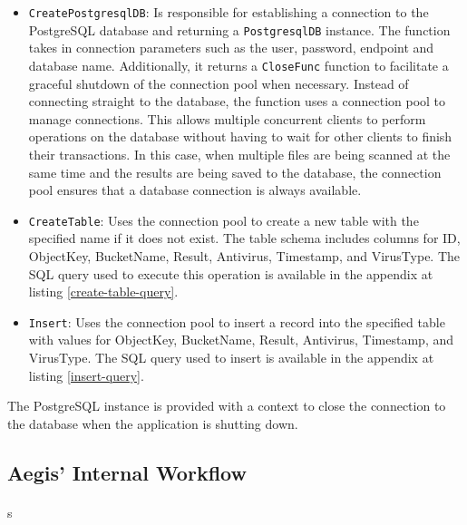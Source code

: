 \documentclass[12pt, conference, final, a4paper, onecolumn, compsoc]{IEEEtran}
\begin{document}
\begin{itemize}
  \item \texttt{CreatePostgresqlDB}: Is responsible for establishing a
        connection to the PostgreSQL database and returning a
        \texttt{PostgresqlDB} instance. The function takes in connection
        parameters such as the user, password, endpoint and database name.
        Additionally, it returns a \texttt{CloseFunc} function to facilitate a
        graceful shutdown of the connection pool when necessary. Instead of
        connecting straight to the database, the function uses a connection pool
        to manage connections. This allows multiple concurrent clients to
        perform operations on the database without having to wait for other
        clients to finish their transactions. In this case, when multiple files
        are being scanned at the same time and the results are being saved to
        the database, the connection pool ensures that a database connection is
        always available.
  \item \texttt{CreateTable}: Uses the connection pool to create a new table
        with the specified name if it does not exist. The table schema includes
        columns for ID, ObjectKey, BucketName, Result, Antivirus, Timestamp, and
        VirusType. The SQL query used to execute this operation is available in
        the appendix at listing \ref{create-table-query}.
  \item \texttt{Insert}: Uses the connection pool to insert a record into the
        specified table with values for ObjectKey, BucketName, Result,
        Antivirus, Timestamp, and VirusType. The SQL query used to insert is
        available in the appendix at listing \ref{insert-query}.
\end{itemize}

The PostgreSQL instance is provided with a context to close the connection to
the database when the application is shutting down.

\subsection*{Aegis' Internal Workflow}
\paragraph{}

s
\end{document}
